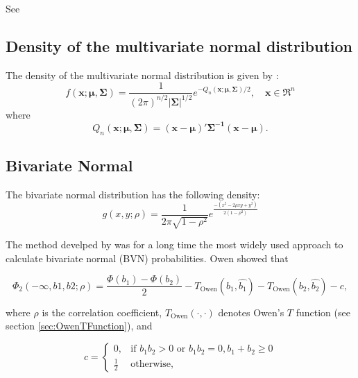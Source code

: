 See \cite{Lai_2006}

\subsection{Density of the  multivariate normal distribution}
\label{MultivariateNormalDistributionDensity}

The density of the  multivariate normal distribution is given by \citep{Tong_1990}:
\begin{equation} \label{eq:MultivariateNormalDistributionDensity}
	f(\boldsymbol{x; \mu, \Sigma}) = \frac{1}{(2\pi)^{n/2}  \vert \boldsymbol{\Sigma} \vert ^{1/2}} e^{-Q_n(\boldsymbol{x; \mu, \Sigma})/2}, \quad \boldsymbol{x} \in \Re^n
\end{equation}
where
\begin{equation}
	Q_n(\boldsymbol{x; \mu, \Sigma}) = (\boldsymbol{x - \mu})' \boldsymbol{\Sigma^{-1}} (\boldsymbol{x - \mu}).
\end{equation}




\subsection{Bivariate Normal}

The bivariate normal distribution has the following density:
\begin{equation}
	g(x,y;\rho) = \frac{1}{2 \pi \sqrt{1-\rho^2}} e^{\frac{-(x^2 -2\rho x y + y^2)}{2(1-\rho^2)}}
\end{equation}


The method develped by \cite{owen_1956} was for a long time the most widely used approach to calculate bivariate normal (BVN) probabilities. Owen showed that

\begin{equation}
	\Phi_2(-\infty, b1,b2;\rho) = \frac{\Phi(b_1) - \Phi(b_2)}{2} - T_{\text{Owen}}(b_1,\widehat{b_1}) - T_{\text{Owen}}(b_2,\widehat{b_2}) - c, 
\end{equation}

where $\rho$ is the correlation coefficient,  $T_{\text{Owen}}(\cdot,\cdot)$ denotes Owen's $T$ function (see section \ref{sec:OwenTFunction}), and


\begin{equation}
	c=\begin{cases}
		0, &  \text{if }b_1 b_2 > 0 \text{ or }b_1 b_2 = 0,  b_1 + b_2 \geq 0\\
		\frac{1}{2} & \text{otherwise, }
	\end{cases}
\end{equation}

